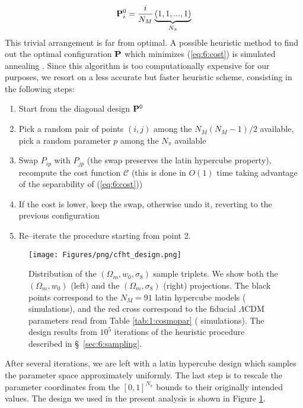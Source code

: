 \begin{equation}
\label{eq:6:diagonal}
\mathbf{P}^0_{i} = \frac{i}{N_M}\underbrace{(1,1,...,1)}_{N_\pi}
\end{equation}
%  
This trivial arrangement is far from optimal. A possible heuristic method to find out the optimal configuration $\mathbf{P}$ which minimizes (\ref{eq:6:cost}) is simulated annealing \citep{Skiena}. Since this algorithm is too computationally expensive for our purposes, we resort on a less accurate but faster heuristic scheme, consisting in the following steps: 
\begin{enumerate}
\item Start from the diagonal design $\mathbf{P}^0$
\item Pick a random pair of points $(i,j)$ among the $N_M(N_M-1)/2$ available, pick a random parameter $p$ among the $N_\pi$ available
\item Swap $P_{ip}$ with $P_{jp}$ (the swap preserves the latin hypercube property), recompute the cost function $\mathcal{C}$ (this is done in $O(1)$ time taking advantage of the separability of (\ref{eq:6:cost}))
\item If the cost is lower, keep the swap, otherwise undo it, reverting to the previous configuration
\item Re--iterate the procedure starting from point 2. 
\end{enumerate}
%
\begin{figure}
\begin{center}
\texttt{[image: Figures/png/cfht\_design.png]}
\end{center}
\caption{Distribution of the $(\Omega_m,w_0,\sigma_8)$ sample triplets. We show both the $(\Omega_m,w_0)$ (left) and the $(\Omega_m,\sigma_8)$ (right) projections. The black points correspond to the $N_M=91$ latin hypercube models ( simulations), and the red cross correspond to the fiducial $\Lambda$CDM parameters read from Table \ref{tab:1:cosmopar} ( simulations). The design results from $10^5$ iterations of the heuristic procedure described in \S~\ref{sec:6:sampling}.}
\label{fig:6:sampling}
\end{figure}
%
After several iterations, we are left with a latin hypercube design which samples the parameter space approximately uniformly. The last step is to rescale the parameter coordinates from the $[0,1]^{N_\pi}$ bounds to their originally intended values. The design we used in the present analysis is shown in Figure \ref{fig:6:sampling}. 

